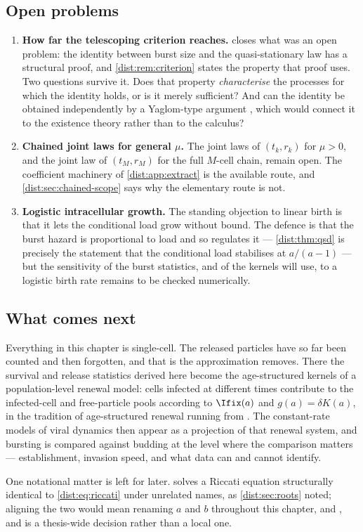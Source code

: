 \subsection{Open problems}
\label{dist:sec:open-problems}

\begin{enumerate}[leftmargin=*,itemsep=2pt]
\item \textbf{How far the telescoping criterion reaches.}
 closes what was an open problem: the identity
between burst size and the quasi-stationary law has a structural proof, and
\cref{dist:rem:criterion} states the property that proof uses. Two questions
survive it. Does that property \emph{characterise} the processes for which
the identity holds, or is it merely sufficient? And can the identity be
obtained independently by a Yaglom-type argument
\cite{yaglom1947certain}, which would connect it to the existence theory
rather than to the calculus?
\item \textbf{Chained joint laws for general $\mu$.} The joint laws of
$(t_k,r_k)$ for $\mu>0$, and the joint law of $(t_M,r_M)$ for the full
$M$-cell chain, remain open. The coefficient machinery of
\cref{dist:app:extract} is the available route, and
\cref{dist:sec:chained-scope} says why the elementary route is not.
\item \textbf{Logistic intracellular growth.} The standing objection to linear
birth is that it lets the conditional load grow without bound. The defence is
that the burst hazard is proportional to load and so regulates it ---
\cref{dist:thm:qsd} is precisely the statement that the conditional load
stabilises at $a/(a-1)$ --- but the sensitivity of the burst statistics, and
of the kernels \ChPop{} will use, to a logistic birth rate remains to be
checked numerically.
\end{enumerate}

\subsection{What comes next}
\label{dist:sec:next}

Everything in this chapter is single-cell. The released particles have so far
been counted and then forgotten, and that is the approximation \ChPop{}
removes. There the survival and release statistics derived here become the
age-structured kernels of a population-level renewal model: cells infected at
different times contribute to the infected-cell and free-particle pools
according to $\Ifix(a)$ and $g(a)=\delta K(a)$, in the tradition of
age-structured renewal running from
\cite{mckendrick1926applications,vonfoerster1959some}. The constant-rate
models of viral dynamics then appear as a projection of that renewal system,
and bursting is compared against budding at the level where the comparison
matters --- establishment, invasion speed, and what data can and cannot
identify.

One notational matter is left for later. 
solves a Riccati equation structurally identical to \cref{dist:eq:riccati}
under unrelated names, as \cref{dist:sec:roots} noted; aligning the two would
mean renaming $a$ and $b$ throughout this chapter, \ChCore{} and \ChPop, and
is a thesis-wide decision rather than a local one.
